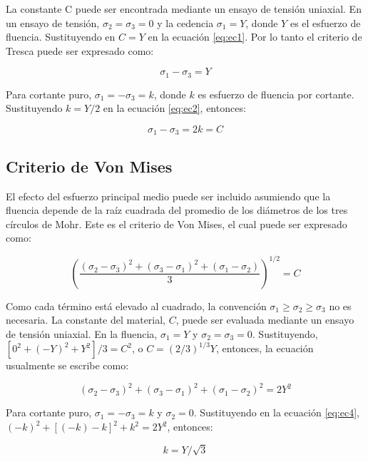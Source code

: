 La constante C puede ser encontrada mediante un ensayo de tensión uniaxial. En un ensayo de tensión, 
$\sigma_2 = \sigma_3 = 0$ y la cedencia $\sigma_1 = Y$, donde $Y$ es el esfuerzo de fluencia. Sustituyendo 
en $C=Y$ en la ecuación \ref{eq:ec1}. Por lo tanto el criterio de Tresca puede ser expresado como:

\begin{equation}\label{eq:ec2}
\sigma_1 - \sigma_3 = Y
\end{equation}

Para cortante puro, $ \sigma_1 = -\sigma_3 = k$, donde $k$ es esfuerzo de fluencia por cortante. Sustituyendo 
$ k = Y/2 $ en la ecuación \ref{eq:ec2}, entonces:

\begin{equation}
\sigma_1 - \sigma_3 = 2k = C
\end{equation}

\subsection{Criterio de Von Mises}

El efecto del esfuerzo principal medio puede ser incluido asumiendo que la fluencia depende de la raíz cuadrada 
del promedio de los diámetros de los tres círculos de Mohr. Este es el criterio de Von Mises, el cual puede ser 
expresado como:

\begin{equation} \label{eq:ec3}
\left( \frac{ (\sigma_2-\sigma_3)^2 + (\sigma_3-\sigma_1 )^2 + (\sigma_1-\sigma_2)}{3} \right) ^{1/2} = C
\end{equation}

Como cada término está elevado al cuadrado, la convención $\sigma_1 \geq \sigma_2 \geq \sigma_3$ no es necesaria. 
La constante del material, $C$, puede ser evaluada mediante un ensayo de tensión uniaxial. En la fluencia, 
$\sigma_1 = Y$ y $\sigma_2 = \sigma_3 = 0$. Sustituyendo, $[0^2 + (-Y)^2 + Y^2]/3 = C^2$, o 
$C = (2/3)^{1/3} Y $, entonces, la ecuación usualmente se escribe como:

\begin{equation}\label{eq:ec4}
(\sigma_2-\sigma_3)^2 + (\sigma_3-\sigma_1 )^2 + (\sigma_1-\sigma_2 )^2 = 2Y^2
\end{equation}

Para cortante puro, $\sigma_1 = -\sigma_3 = k$ y $\sigma_2=0$. Sustituyendo en la ecuación \ref{eq:ec4}, 
$ (-k)^2 + [ (-k)-k ]^2 + k^2 = 2Y^2 $, entonces:

\begin{equation}\label{eq:ec5}
k = Y / \sqrt{3}
\end{equation}

